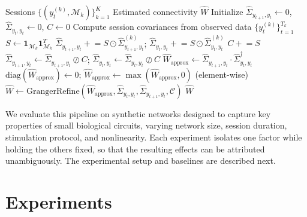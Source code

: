 \documentclass{article}
\begin{document}
\begin{algorithm}[ht]
\caption{Covariance Accumulation + Granger-Inspired Refinement}
\label{alg:pipeline}
\begin{algorithmic}[1]
\REQUIRE Sessions $\{(y_t^{(k)}, \mathcal{M}_k)\}_{k=1}^K$
\ENSURE Estimated connectivity $\hat{W}$
\STATE Initialize $\hat{\Sigma}_{y_{t+1},y_t} \leftarrow 0$, $\hat{\Sigma}_{y_t,y_t} \leftarrow 0$, $C \leftarrow 0$ 
    \STATE Compute session covariances from observed data $\{y_t^{(k)}\}_{t=1}^{T_k}$
    \STATE $S \leftarrow \mathbf{1}_{\mathcal{M}_k} \mathbf{1}_{\mathcal{M}_k}^T$ 
    \STATE $\hat{\Sigma}_{y_{t+1},y_t} \mathrel{+}= S \odot \hat{\Sigma}^{(k)}_{y_{t+1},y_t}$; \quad $\hat{\Sigma}_{y_t,y_t} \mathrel{+}= S \odot \hat{\Sigma}^{(k)}_{y_t,y_t}$
    \STATE $C \mathrel{+}= S$
\ENDFOR
\STATE $\hat{\Sigma}_{y_{t+1},y_t} \leftarrow \hat{\Sigma}_{y_{t+1},y_t} \oslash C$; \quad $\hat{\Sigma}_{y_t,y_t} \leftarrow \hat{\Sigma}_{y_t,y_t} \oslash C$ 
\STATE $\hat{W}_{\text{approx}} \leftarrow \hat{\Sigma}_{y_{t+1},y_t} \cdot \hat{\Sigma}_{y_t,y_t}^{\dagger}$ 
\STATE $\text{diag}(\hat{W}_{\text{approx}}) \leftarrow 0$; \quad $\hat{W}_{\text{approx}} \leftarrow \max(\hat{W}_{\text{approx}}, 0)$ (element-wise) 
\STATE $\hat{W} \leftarrow \text{GrangerRefine}(\hat{W}_{\text{approx}}, \hat{\Sigma}_{y_t,y_t}, \hat{\Sigma}_{y_{t+1},y_t}, \mathcal{C})$ 
\RETURN $\hat{W}$
\end{algorithmic}
\end{algorithm}

We evaluate this pipeline on synthetic networks designed to capture key properties of small biological circuits, varying network size, session duration, stimulation protocol, and nonlinearity.
Each experiment isolates one factor while holding the others fixed, so that the resulting effects can be attributed unambiguously.
The experimental setup and baselines are described next.

\section{Experiments}
\label{sec:experiments}
\end{document}
